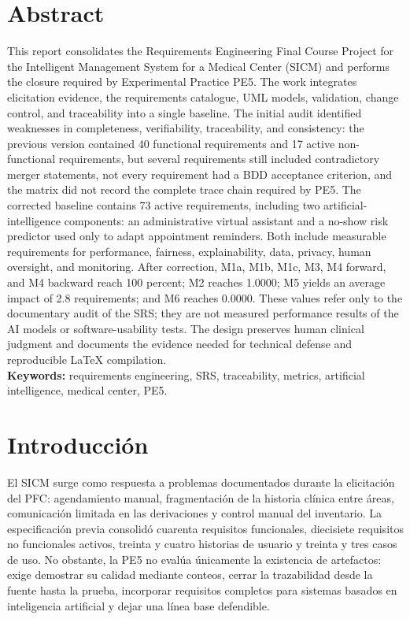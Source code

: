 \documentclass[11pt,a4paper]{article}
\begin{document}
\section*{Abstract}
This report consolidates the Requirements Engineering Final Course Project for the Intelligent Management System for a Medical Center (SICM) and performs the closure required by Experimental Practice PE5. The work integrates elicitation evidence, the requirements catalogue, UML models, validation, change control, and traceability into a single baseline. The initial audit identified weaknesses in completeness, verifiability, traceability, and consistency: the previous version contained 40 functional requirements and 17 active non-functional requirements, but several requirements still included contradictory merger statements, not every requirement had a BDD acceptance criterion, and the matrix did not record the complete trace chain required by PE5. The corrected baseline contains 73 active requirements, including two artificial-intelligence components: an administrative virtual assistant and a no-show risk predictor used only to adapt appointment reminders. Both include measurable requirements for performance, fairness, explainability, data, privacy, human oversight, and monitoring. After correction, M1a, M1b, M1c, M3, M4 forward, and M4 backward reach 100 percent; M2 reaches 1.0000; M5 yields an average impact of 2.8 requirements; and M6 reaches 0.0000. These values refer only to the documentary audit of the SRS; they are not measured performance results of the AI models or software-usability tests. The design preserves human clinical judgment and documents the evidence needed for technical defense and reproducible LaTeX compilation.\\[0.25cm]
\textbf{Keywords:} requirements engineering, SRS, traceability, metrics, artificial intelligence, medical center, PE5.
\clearpage
\tableofcontents\clearpage
\listoftables\clearpage
\listoffigures\clearpage
{}
\section{Introducción}
El SICM surge como respuesta a problemas documentados durante la elicitación del PFC: agendamiento manual, fragmentación de la historia clínica entre áreas, comunicación limitada en las derivaciones y control manual del inventario. La especificación previa consolidó cuarenta requisitos funcionales, diecisiete requisitos no funcionales activos, treinta y cuatro historias de usuario y treinta y tres casos de uso. No obstante, la PE5 no evalúa únicamente la existencia de artefactos: exige demostrar su calidad mediante conteos, cerrar la trazabilidad desde la fuente hasta la prueba, incorporar requisitos completos para sistemas basados en inteligencia artificial y dejar una línea base defendible.
\end{document}
